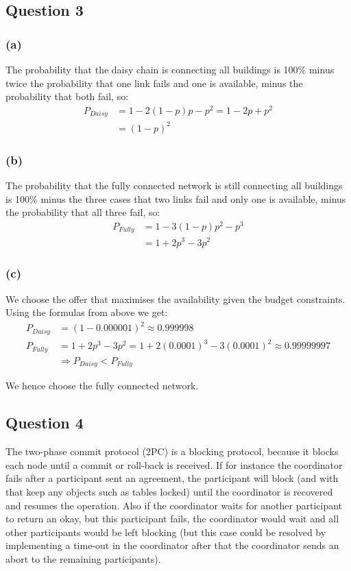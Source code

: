 \documentclass[12pt,a4paper,fleqn]{article}
\begin{document}
\subsection*{Question 3}
\label{sec:eq3}

\subsubsection*{(a)}
The probability that the daisy chain is connecting all buildings is 100\% minus twice the probability that one link fails and one is available, minus the probability that both fail, so: 
\begin{align*}
P_{Daisy} &= 1-2(1-p)p - p^2 = 1-2p + p^2 \\
&= (1-p)^2
\end{align*}

\subsubsection*{(b)}
The probability that the fully connected network is still connecting all buildings is 100\% minus the three cases that two links fail and only one is available, minus the probability that all three fail, so:
\begin{align*}
P_{Fully} &= 1-3(1-p)p^2 - p^3 \\
&= 1 + 2p^3 - 3p^2
\end{align*}

\subsubsection*{(c)}
We choose the offer that maximises the availability given the budget constraints. Using the formulas from above we get:
\begin{align*}
P_{Daisy} &= (1-0.000001)^2 \approx 0.999998 \\
P_{Fully} &= 1 + 2p^3 - 3p^2 = 1 + 2(0.0001)^3-3(0.0001)^2 \approx 0.99999997 \\ 
&\Rightarrow P_{Daisy} < P_{Fully}
\end{align*}

We hence choose the fully connected network.

\subsection*{Question 4}
\label{sec:eq4}

The two-phase commit protocol (2PC) is a blocking protocol, because it blocks each node until a commit or roll-back is received. If for instance the coordinator fails after a participant sent an agreement, the participant will block (and with that keep any objects such as tables locked) until the coordinator is recovered and resumes the operation. Also if the coordinator waits for another participant to return an okay, but this participant fails, the coordinator would wait and all other participants would be left blocking (but this case could be resolved by implementing a time-out in the coordinator after that the coordinator sends an abort to the remaining participants). 
\end{document}
